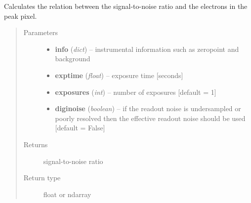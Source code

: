 \documentclass[a4paper,12pt,english]{sphinxmanual}
\begin{document}

\begin{fulllineitems}
\label{ETC:analysis.ETC.SNRproptoPeak}
Calculates the relation between the signal-to-noise ratio and the electrons in the peak pixel.
\begin{quote}\begin{description}
\item[{Parameters}] \leavevmode\begin{itemize}
\item {} 
\textbf{info} (\emph{dict}) -- instrumental information such as zeropoint and background

\item {} 
\textbf{exptime} (\emph{float}) -- exposure time {[}seconds{]}

\item {} 
\textbf{exposures} (\emph{int}) -- number of exposures {[}default = 1{]}

\item {} 
\textbf{diginoise} (\emph{boolean}) -- if the readout noise is undersampled or poorly resolved then the effective readout noise
should be used {[}default = False{]}

\end{itemize}

\item[{Returns}] \leavevmode
signal-to-noise ratio

\item[{Return type}] \leavevmode
float or ndarray

\end{description}\end{quote}

\end{fulllineitems}

\end{document}
